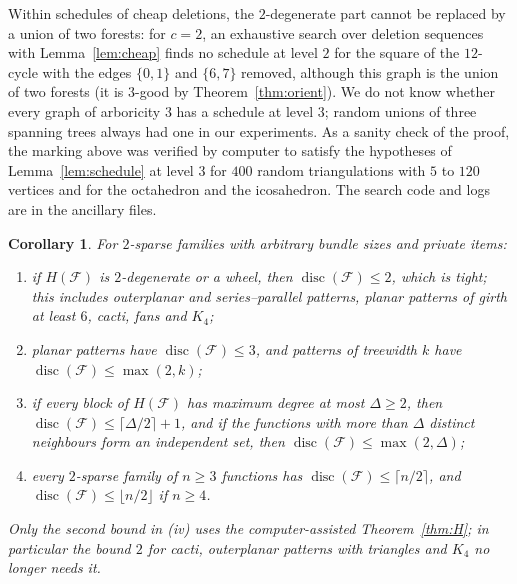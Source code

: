 \documentclass[11pt,letterpaper]{article}
\newtheorem{corollary}[theorem]{Corollary}
\theoremstyle{definition}
\newcommand{\cF}{\mathcal{F}}
\DeclareMathOperator{\disc}{disc}
\begin{document}
Within schedules of cheap deletions, the $2$-degenerate part cannot be replaced by a union of two
forests: for $c=2$, an exhaustive search
over deletion sequences with Lemma~\ref{lem:cheap} finds no schedule at level $2$ for the square of the
$12$-cycle with the edges $\{0,1\}$ and $\{6,7\}$ removed, although this graph is the union of two
forests (it is $3$-good by Theorem~\ref{thm:orient}). We do not know whether every graph of arboricity
$3$ has a schedule at level $3$; random unions of three spanning trees always had one in our
experiments. As a sanity check of the proof, the marking above was verified by computer to satisfy the
hypotheses of Lemma~\ref{lem:schedule} at level $3$ for $400$ random triangulations with $5$ to $120$
vertices and for the octahedron and the icosahedron. The search code and logs are in the ancillary
files.

\begin{corollary}\label{cor:maxtwod}
For $2$-sparse families with arbitrary bundle sizes and private items:
\begin{enumerate}[label=(\roman*),itemsep=0pt]
\item if $H(\cF)$ is $2$-degenerate or a wheel, then $\disc(\cF)\le2$, which is tight; this includes
outerplanar and series--parallel patterns, planar patterns of girth at least $6$, cacti, fans and $K_4$;
\item planar patterns have $\disc(\cF)\le3$, and patterns of treewidth $k$ have $\disc(\cF)\le\max(2,k)$;
\item if every block of $H(\cF)$ has maximum degree at most $\Delta\ge2$, then
$\disc(\cF)\le\lceil\Delta/2\rceil+1$, and if the functions with more than $\Delta$ distinct neighbours form
an independent set, then $\disc(\cF)\le\max(2,\Delta)$;
\item every $2$-sparse family of $n\ge3$ functions has $\disc(\cF)\le\lceil n/2\rceil$, and
$\disc(\cF)\le\lfloor n/2\rfloor$ if $n\ge4$.
\end{enumerate}
Only the second bound in (iv) uses the computer-assisted Theorem~\ref{thm:H}; in particular the bound $2$
for cacti, outerplanar patterns with triangles and $K_4$ no longer needs it.
\end{corollary}
\end{document}
